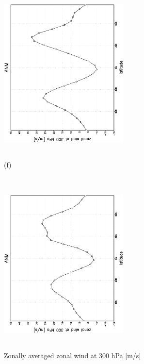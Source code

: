 \documentclass[12pt,a4paper,twoside,openright,headinclude,liststotoc,bibtotoc]{scrreprt}
\begin{document}
\begin{appendix}
\begin{figure}[b]
{\includegraphics[height=8.5cm,width=6.5cm,angle=-90]
{eps/zontmu_300.eps}
}
\parbox{8.5cm}{\hspace{0.80cm} \begin{scriptsize}(f) \end{scriptsize} \vspace{-0.5cm} \\
\includegraphics[height=8.5cm,width=6.5cm,angle=-90]
{eps/t21zontmuvel131300.eps}
}
\caption[Zonally averaged zonal wind at 300 hPa]{Zonally averaged zonal wind at 300 hPa [m/s]}
\label{img:uzon300}
\end{figure}



\end{appendix}
\end{document}
